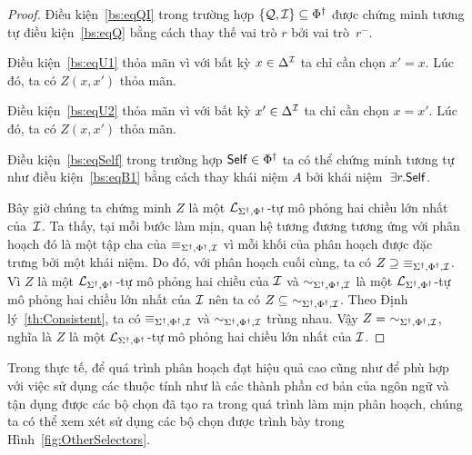 \begin{proof}
	\semiItem{}Điều kiện~\eqref{bs:eqQI} trong trường hợp $\{\mathcal{Q}, \mathcal{I}\} \subseteq \Phi^\dag$ được chứng minh tương tự điều kiện~\eqref{bs:eqQ} bằng cách thay thế vai trò $r$ bởi vai trò~$r^-$.
	
	\semiItem{}Điều kiện~\eqref{bs:eqU1} thỏa mãn vì với bất kỳ $x\in\Delta^{\mathcal{I}}$ ta chỉ cần chọn $x' = x$. Lúc đó, ta có $Z(x, x')$ thỏa mãn.
	
	\semiItem{}Điều kiện~\eqref{bs:eqU2} thỏa mãn vì với bất kỳ $x'\in\Delta^{\mathcal{I}}$ ta chỉ cần chọn $x = x'$. Lúc đó, ta có $Z(x, x')$ thỏa mãn.
	
	\semiItem{}Điều kiện~\eqref{bs:eqSelf} trong trường hợp $\mathsf{Self} \in \Phi^\dag$ ta có thể chứng minh tương tự như điều kiện~\eqref{bs:eqB1} bằng cách thay khái niệm $A$ bởi khái niệm~$\exists r.\mathsf{Self}$.
	
	Bây giờ chúng ta chứng minh $Z$ là một $\mathcal{L}_{\Sigma^\dag,\Phi^\dag}$-tự mô phỏng hai chiều lớn nhất của~$\mathcal{I}$.
%
	Ta thấy, tại mỗi bước làm mịn, quan hệ tương đương tương ứng với phân hoạch đó là một tập cha của $\equiv_{\Sigma^\dag,\Phi^\dag,\mathcal{I}}$ vì mỗi khối của phân hoạch được đặc trưng bởi một khái niệm. Do đó, với phân hoạch cuối cùng, ta có $Z \supseteq\ \equiv_\SdPdI$.
	Vì $Z$ là một $\mathcal{L}_{\Sigma^\dag,\Phi^\dag}$-tự mô phỏng hai chiều của $\mathcal{I}$ và $\sim_{\Sigma^\dag,\Phi^\dag,\mathcal{I}}$ là một $\mathcal{L}_{\Sigma^\dag,\Phi^\dag}$-tự mô phỏng hai chiều lớn nhất của $\mathcal{I}$ nên ta có $Z \subseteq\ \sim_{\Sigma^\dag,\Phi^\dag,\mathcal{I}}$. Theo Định lý~\ref{th:Consistent}, ta có $\equiv_{\Sigma^\dag,\Phi^\dag,\mathcal{I}}$ và $\sim_{\Sigma^\dag,\Phi^\dag,\mathcal{I}}$ trùng nhau. Vậy $Z =\ \sim_{\Sigma^\dag,\Phi^\dag,\mathcal{I}}$, nghĩa là $Z$ là một $\mathcal{L}_{\Sigma^\dag,\Phi^\dag}$-tự mô phỏng hai chiều lớn nhất của $\mathcal{I}$.
\end{proof}

Trong thực tế, để quá trình phân hoạch đạt hiệu quả cao cũng như để phù hợp với việc sử dụng các thuộc tính như là các thành phần cơ bản của ngôn ngữ và tận dụng được các bộ chọn đã tạo ra trong quá trình làm mịn phân hoạch, chúng ta có thể xem xét sử dụng các bộ chọn được trình bày trong Hình~\ref{fig:OtherSelectors}.

